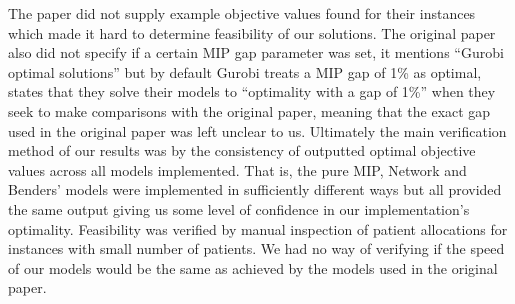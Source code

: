 The paper did not supply example objective values found for their instances which made it hard to determine feasibility of our solutions. The original paper also did not specify if a certain MIP gap parameter was set, it mentions ``Gurobi optimal solutions'' but by default Gurobi treats a MIP gap of 1\% as optimal,~\cite{guo} states that they solve their models to ``optimality with a gap of 1\%'' when they seek to make comparisons with the original paper, meaning that the exact gap used in the original paper was left unclear to us. Ultimately the main verification method of our results was by the consistency of outputted optimal objective values across all models implemented. That is, the pure MIP, Network and Benders' models were implemented in sufficiently different ways but all provided the same output giving us some level of confidence in our implementation's optimality. Feasibility was verified by manual inspection of patient allocations for instances with small number of patients. We had no way of verifying if the speed of our models would be the same as achieved by the models used in the original paper.